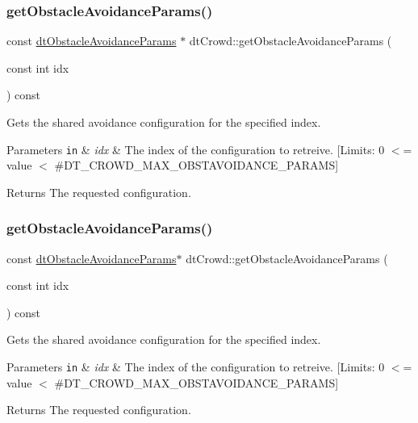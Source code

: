 \subsubsection{\texorpdfstring{get\+Obstacle\+Avoidance\+Params()}{getObstacleAvoidanceParams()}\hspace{0.1cm}{\footnotesize\ttfamily [1/2]}}
{\footnotesize\ttfamily const \hyperlink{structdtObstacleAvoidanceParams}{dt\+Obstacle\+Avoidance\+Params} $\ast$ dt\+Crowd\+::get\+Obstacle\+Avoidance\+Params (\begin{DoxyParamCaption}\item[{const int}]{idx }\end{DoxyParamCaption}) const}

Gets the shared avoidance configuration for the specified index. 
\begin{DoxyParams}[1]{Parameters}
\mbox{\tt in}  & {\em idx} & The index of the configuration to retreive. \mbox{[}Limits\+: 0 $<$= value $<$ \#\+D\+T\+\_\+\+C\+R\+O\+W\+D\+\_\+\+M\+A\+X\+\_\+\+O\+B\+S\+T\+A\+V\+O\+I\+D\+A\+N\+C\+E\+\_\+\+P\+A\+R\+A\+MS\mbox{]} \\
\hline
\end{DoxyParams}
\begin{DoxyReturn}{Returns}
The requested configuration. 
\end{DoxyReturn}
\mbox{\label{classdtCrowd_a4381894f6ac7c255478d64773e4c781c}} 
\subsubsection{\texorpdfstring{get\+Obstacle\+Avoidance\+Params()}{getObstacleAvoidanceParams()}\hspace{0.1cm}{\footnotesize\ttfamily [2/2]}}
{\footnotesize\ttfamily const \hyperlink{structdtObstacleAvoidanceParams}{dt\+Obstacle\+Avoidance\+Params}$\ast$ dt\+Crowd\+::get\+Obstacle\+Avoidance\+Params (\begin{DoxyParamCaption}\item[{const int}]{idx }\end{DoxyParamCaption}) const}

Gets the shared avoidance configuration for the specified index. 
\begin{DoxyParams}[1]{Parameters}
\mbox{\tt in}  & {\em idx} & The index of the configuration to retreive. \mbox{[}Limits\+: 0 $<$= value $<$ \#\+D\+T\+\_\+\+C\+R\+O\+W\+D\+\_\+\+M\+A\+X\+\_\+\+O\+B\+S\+T\+A\+V\+O\+I\+D\+A\+N\+C\+E\+\_\+\+P\+A\+R\+A\+MS\mbox{]} \\
\hline
\end{DoxyParams}
\begin{DoxyReturn}{Returns}
The requested configuration. 
\end{DoxyReturn}
\mbox{\label{classdtCrowd_a5300bc081c832dde048affb6bd077afb}} 

